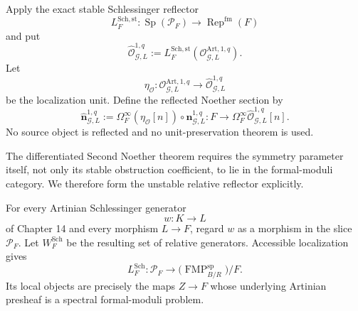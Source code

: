 \begin{construction}
\label{constr:symmetry-noether-stable-schlessinger-reflection-of-the-coefficient-and-section}
Apply the exact stable Schlessinger reflector
\[
L_F^{\mathrm{Sch},\mathrm{st}}:
\operatorname{Sp}(\mathcal P_F)
\longrightarrow
\operatorname{Rep}^{\mathrm{fm}}(F)
\]
and put
\[
\widehat{\mathcal O}_{\mathcal G,L}^{1,q}
:=
L_F^{\mathrm{Sch},\mathrm{st}}
\left(
\mathcal O_{\mathcal G,L}^{\mathrm{Art},1,q}
\right).
\]
Let
\[
\eta_{\mathcal O}:
\mathcal O_{\mathcal G,L}^{\mathrm{Art},1,q}
\longrightarrow
\widehat{\mathcal O}_{\mathcal G,L}^{1,q}
\]
be the localization unit.  Define the reflected Noether section by
\[
\boxed{
\widehat{\mathbf n}_{\mathcal G,L}^{1,q}
:=
\Omega_F^\infty(\eta_{\mathcal O}[n])
\circ
\mathbf n_{\mathcal G,L}^{1,q}
:
F\longrightarrow
\Omega_F^\infty
\widehat{\mathcal O}_{\mathcal G,L}^{1,q}[n].
}
\]
No source object is reflected and no unit-preservation theorem is used.
\end{construction}

\begin{construction}
\label{constr:symmetry-noether-relative-unstable-schlessinger-reflector-over-a-formal-leaf}
The differentiated Second Noether theorem requires the symmetry parameter itself,
not only its stable obstruction coefficient, to lie in the formal-moduli category.
We therefore form the unstable relative reflector explicitly.

For every Artinian Schlessinger generator
\[
w:K\longrightarrow L
\]
of Chapter 14 and every morphism $L\to F$, regard $w$ as a morphism in the slice
$\mathcal P_F$.  Let $W_F^{\mathrm{Sch}}$ be the resulting set of relative
generators.  Accessible localization gives
\[
\boxed{
L_F^{\mathrm{Sch}}:
\mathcal P_F
\longrightarrow
\bigl(\operatorname{FMP}^{\mathrm{sp}}_{B/R}\bigr)/F .
}
\]
Its local objects are precisely the maps $Z\to F$ whose underlying Artinian
presheaf is a spectral formal-moduli problem.
\end{construction}

